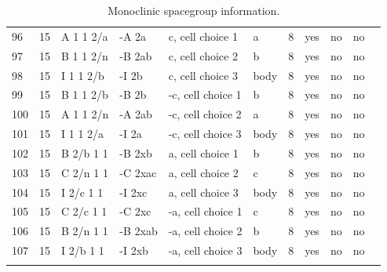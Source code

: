 \begin{center}
\begin{small}
\begin{longtable}{|l|l|l|l|l|l|l|l|l|l|l|}
96 &15 &A 1 1 2/a &-A 2a &c, cell choice 1 &a &8 &yes &no &no \\ 
97 &15 &B 1 1 2/n &-B 2ab &c, cell choice 2 &b &8 &yes &no &no \\ 
98 &15 &I 1 1 2/b &-I 2b &c, cell choice 3 &body &8 &yes &no &no \\ 
99 &15 &B 1 1 2/b &-B 2b &-c, cell choice 1 &b &8 &yes &no &no \\ 
100 &15 &A 1 1 2/n &-A 2ab &-c, cell choice 2 &a &8 &yes &no &no \\ 
101 &15 &I 1 1 2/a &-I 2a &-c, cell choice 3 &body &8 &yes &no &no \\ 
102 &15 &B 2/b 1 1 &-B 2xb &a, cell choice 1 &b &8 &yes &no &no \\ 
103 &15 &C 2/n 1 1 &-C 2xac &a, cell choice 2 &c &8 &yes &no &no \\ 
104 &15 &I 2/c 1 1 &-I 2xc &a, cell choice 3 &body &8 &yes &no &no \\ 
105 &15 &C 2/c 1 1 &-C 2xc &-a, cell choice 1 &c &8 &yes &no &no \\ 
106 &15 &B 2/n 1 1 &-B 2xab &-a, cell choice 2 &b &8 &yes &no &no \\ 
107 &15 &I 2/b 1 1 &-I 2xb &-a, cell choice 3 &body &8 &yes &no &no \\ 
\hline
\caption{Monoclinic spacegroup information.}
\end{longtable}


\end{small}
\end{center}
